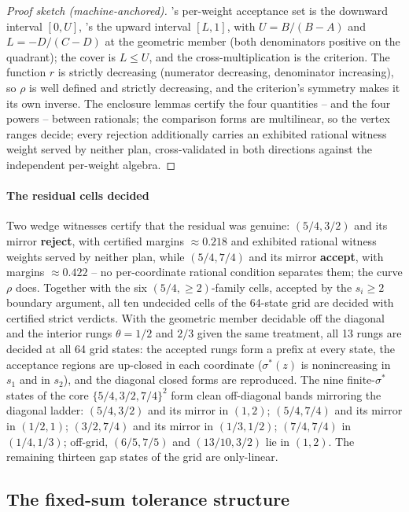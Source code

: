 \begin{proof}[Proof sketch (machine-anchored)]
's per-weight acceptance set is the downward interval $[0,U]$, 's the upward interval $[L,1]$, with $U=B/(B-A)$ and $L=-D/(C-D)$ at the geometric member (both denominators positive on the quadrant); the cover is $L\le U$, and the cross-multiplication is the criterion. The function $r$ is strictly decreasing (numerator decreasing, denominator increasing), so $\rho$ is well defined and strictly decreasing, and the criterion's symmetry makes it its own inverse. The enclosure lemmas certify the four quantities -- and the four powers -- between rationals; the comparison forms are multilinear, so the vertex ranges decide; every rejection additionally carries an exhibited rational witness weight served by neither plan, cross-validated in both directions against the independent per-weight algebra.
\end{proof}

\paragraph{The residual cells decided} Two wedge witnesses certify that the residual was genuine: $(5/4,3/2)$ and its mirror \textbf{reject}, with certified margins $\approx0.218$ and exhibited rational witness weights served by neither plan, while $(5/4,7/4)$ and its mirror \textbf{accept}, with margins $\approx0.422$ -- no per-coordinate rational condition separates them; the curve $\rho$ does. Together with the six $(5/4,\ge2)$-family cells, accepted by the $s_i\ge2$ boundary argument, all ten undecided cells of the 64-state grid are decided with certified strict verdicts. With the geometric member decidable off the diagonal and the interior rungs $\theta=1/2$ and $2/3$ given the same treatment, all 13 rungs are decided at all 64 grid states: the accepted rungs form a prefix at every state, the acceptance regions are up-closed in each coordinate ($\sigma^*(z)$ is nonincreasing in $s_1$ and in $s_2$), and the diagonal closed forms are reproduced. The nine finite-$\sigma^*$ states of the core $\{5/4,3/2,7/4\}^2$ form clean off-diagonal bands mirroring the diagonal ladder: $(5/4,3/2)$ and its mirror in $(1,2)$; $(5/4,7/4)$ and its mirror in $(1/2,1)$; $(3/2,7/4)$ and its mirror in $(1/3,1/2)$; $(7/4,7/4)$ in $(1/4,1/3)$; off-grid, $(6/5,7/5)$ and $(13/10,3/2)$ lie in $(1,2)$. The remaining thirteen gap states of the grid are only-linear.

\subsection{The fixed-sum tolerance structure}

